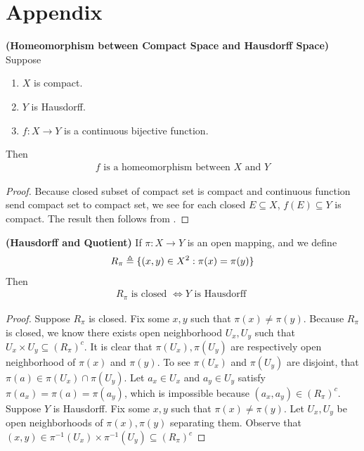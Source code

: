 \documentclass{report}
\begin{document}
\section{Appendix} 
\begin{theorem}
\label{HbC}
\textbf{(Homeomorphism between Compact Space and Hausdorff Space)} Suppose 
\begin{enumerate}[label=(\alph*)]
  \item $X$ is compact.  
  \item $Y$ is Hausdorff.  
  \item $f:X\rightarrow Y$ is a continuous bijective function. 
\end{enumerate}
Then 
\begin{align*}
f\text{ is a homeomorphism between }X\text{ and }Y
\end{align*}
\end{theorem}
\begin{proof}
Because closed subset of compact set is compact and continuous function send compact set to compact set, we see for each closed $E\subseteq X$, $f(E)\subseteq Y$ is compact. The result then follows from . 
\end{proof}
\begin{theorem}
\label{Hausdorff and Quotient}
  \textbf{(Hausdorff and Quotient)} If $\pi:X\rightarrow Y$ is an open mapping, and we define
\begin{align*}
R_\pi\triangleq \{ (x,y)\in X^2 : \pi (x)=\pi (y) \} 
\end{align*}
Then
\begin{align*}
R_\pi\text{ is closed }\iff Y\text{ is Hausdorff }
\end{align*}
\end{theorem}
\begin{proof}
  Suppose $R_\pi$ is closed. Fix some $x,y$ such that $\pi (x)\neq \pi (y)$. Because $R_\pi$ is closed, we know there exists open neighborhood $U_x,U_y$ such that $U_x \times U_y \subseteq (R_\pi)^c$. It is clear that $\pi (U_x),\pi (U_y)$ are respectively open neighborhood of $\pi (x)$ and $\pi (y)$. To see $\pi (U_x)$ and $\pi (U_y)$ are disjoint,  that $\pi (a)\in \pi (U_x)\cap \pi (U_y)$. Let $a_x\in U_x$ and $a_y\in U_y$ satisfy $\pi (a_x)=\pi (a)=\pi (a_y)$, which is impossible because $(a_x,a_y)\in (R_\pi)^c$. \CaC\\


Suppose $Y$ is Hausdorff. Fix some  $x,y$ such that  $\pi (x)\neq \pi (y)$. Let $U_x,U_y$ be open neighborhoods of  $\pi (x),\pi (y)$ separating them. Observe that $(x,y)\in \pi^{-1}(U_x)\times \pi^{-1}(U_y)\subseteq (R_\pi)^c$
\end{proof}
\end{document}
